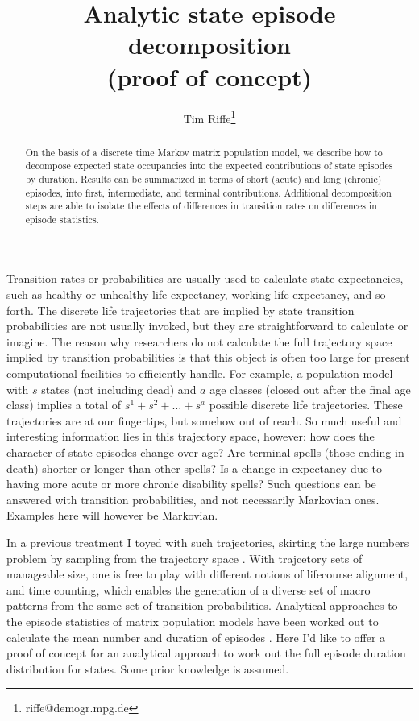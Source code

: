 \documentclass{article}
\begin{document}
\title{Analytic state episode decomposition \\ (proof of concept)}
\author[1]{Tim Riffe\thanks{riffe@demogr.mpg.de}}
\begin{abstract}
On the basis of a discrete time Markov matrix population model, we describe
how to decompose expected state occupancies into the expected contributions of state
episodes by duration. Results can be summarized in terms of short (acute) and
long (chronic) episodes, into first, intermediate, and terminal contributions.
Additional decomposition steps are able to isolate the effects of differences in
transition rates on differences in episode statistics.
\end{abstract}

Transition rates or probabilities are usually used to calculate state
expectancies, such as healthy or unhealthy life expectancy, working life
expectancy, and so forth. The discrete life trajectories that are
implied by state transition probabilities are not usually invoked, but they are
straightforward to calculate or imagine. The reason why researchers do not
calculate the full trajectory space implied by transition probabilities is
that this object is often too large for present computational facilities to
efficiently handle. For example, a population model with $s$ states (not
including dead) and $a$ age classes (closed out after the final age class)
implies a total of $s^1 + s^2 + \ldots + s^a$ possible discrete
life trajectories. These trajectories are at our fingertips, but somehow out of
reach. So much useful and interesting information lies in this trajectory space,
however: how does the character of state episodes change over age? Are
terminal spells (those ending in death) shorter or longer than other spells? Is
a change in expectancy due to having more acute or more chronic disability
spells? Such questions can be answered with transition probabilities, and not
necessarily Markovian ones. Examples here will however be Markovian.

In a previous treatment I toyed with such trajectories,
skirting the large numbers problem by sampling from the trajectory space
\citep{riffespells2018}. With trajcetory sets of manageable size, one is free to
play with different notions of lifecourse alignment, and time counting, which enables
the generation of a diverse set of macro patterns from
the same set of transition probabilities. Analytical approaches to the episode statistics of matrix population models have been worked out to calculate the mean number and duration of episodes \citep{dudel2018b}. Here I'd like to offer a proof of concept for an analytical approach to work out the full episode duration distribution for states. Some prior knowledge is assumed.
\end{document}
